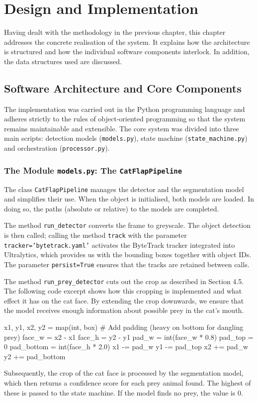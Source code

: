 \chapter{Design and Implementation}
\label{sec:implementierung}

Having dealt with the methodology in the previous chapter, this chapter addresses the concrete realisation of the system. It explains how the architecture is structured and how the individual software components interlock. In addition, the data structures used are discussed.

\section{Software Architecture and Core Components}
The implementation was carried out in the Python programming language and adheres strictly to the rules of object-oriented programming so that the system remains maintainable and extensible. The core system was divided into three main scripts: detection models (\texttt{models.py}), state machine (\texttt{state\_machine.py}) and orchestration (\texttt{processor.py}).

\subsection{The Module \texttt{models.py}: The \texttt{CatFlapPipeline}}
The class \texttt{CatFlapPipeline} manages the detector and the segmentation model and simplifies their use. When the object is initialised, both models are loaded. In doing so, the paths (absolute or relative) to the models are completed.

The method \texttt{run\_detector} converts the frame to greyscale. The object detection is then called; calling the method \texttt{track} with the parameter \texttt{tracker='bytetrack.yaml'} activates the ByteTrack tracker integrated into Ultralytics, which provides us with the bounding boxes together with object IDs. The parameter \texttt{persist=True} ensures that the tracks are retained between calls.

The method \texttt{run\_prey\_detector} cuts out the crop as described in Section 4.5. The following code excerpt shows how this cropping is implemented and what effect it has on the cat face. By extending the crop downwards, we ensure that the model receives enough information about possible prey in the cat's mouth.

\begin{PythonCode}[caption={Asymmetric padding for the crop}]
x1, y1, x2, y2 = map(int, box)
# Add padding (heavy on bottom for dangling prey)
face_w = x2 - x1
face_h = y2 - y1
pad_w = int(face_w * 0.8)
pad_top = 0
pad_bottom = int(face_h * 2.0)
x1 -= pad_w
y1 -= pad_top
x2 += pad_w
y2 += pad_bottom
\end{PythonCode}
Subsequently, the crop of the cat face is processed by the segmentation model, which then returns a confidence score for each prey animal found. The highest of these is passed to the state machine. If the model finds no prey, the value is 0.

